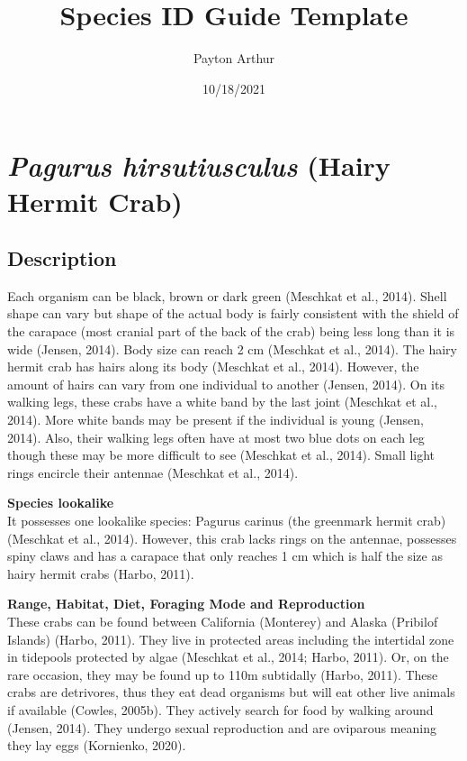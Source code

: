 \documentclass[
]{article}
\title{Species ID Guide Template}
\author{Payton Arthur}
\date{10/18/2021}
\begin{document}
\maketitle

\newpage

\hypertarget{pagurus-hirsutiusculus-hairy-hermit-crab}{%
\section{\texorpdfstring{\emph{Pagurus hirsutiusculus} (Hairy Hermit
Crab)}{Pagurus hirsutiusculus (Hairy Hermit Crab)}}\label{pagurus-hirsutiusculus-hairy-hermit-crab}}

\hypertarget{description}{%
\subsection{Description}\label{description}}

Each organism can be black, brown or dark green (Meschkat et al., 2014).
Shell shape can vary but shape of the actual body is fairly consistent
with the shield of the carapace (most cranial part of the back of the
crab) being less long than it is wide (Jensen, 2014). Body size can
reach 2 cm (Meschkat et al., 2014). The hairy hermit crab has hairs
along its body (Meschkat et al., 2014). However, the amount of hairs can
vary from one individual to another (Jensen, 2014). On its walking legs,
these crabs have a white band by the last joint (Meschkat et al., 2014).
More white bands may be present if the individual is young (Jensen,
2014). Also, their walking legs often have at most two blue dots on each
leg though these may be more difficult to see (Meschkat et al., 2014).
Small light rings encircle their antennae (Meschkat et al., 2014).

\textbf{Species lookalike}\\
It possesses one lookalike species: Pagurus carinus (the greenmark
hermit crab) (Meschkat et al., 2014). However, this crab lacks rings on
the antennae, possesses spiny claws and has a carapace that only reaches
1 cm which is half the size as hairy hermit crabs (Harbo, 2011).

\textbf{Range, Habitat, Diet, Foraging Mode and Reproduction}\\
These crabs can be found between California (Monterey) and Alaska
(Pribilof Islands) (Harbo, 2011). They live in protected areas including
the intertidal zone in tidepools protected by algae (Meschkat et al.,
2014; Harbo, 2011). Or, on the rare occasion, they may be found up to
110m subtidally (Harbo, 2011). These crabs are detrivores, thus they eat
dead organisms but will eat other live animals if available (Cowles,
2005b). They actively search for food by walking around (Jensen, 2014).
They undergo sexual reproduction and are oviparous meaning they lay eggs
(Kornienko, 2020).
\end{document}
